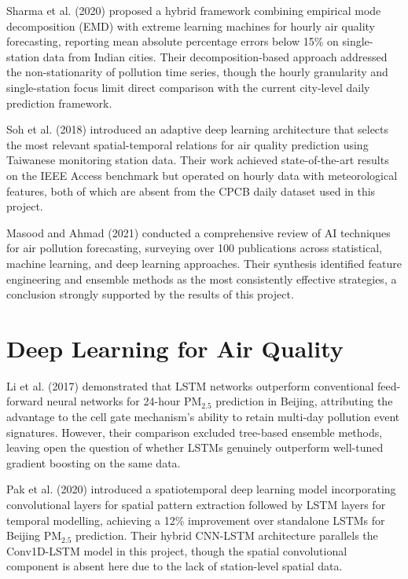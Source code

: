 \documentclass[12pt,a4paper]{report}
\begin{document}
Sharma et al. (2020) proposed a hybrid framework combining empirical mode decomposition (EMD) with extreme learning machines for hourly air quality forecasting, reporting mean absolute percentage errors below 15\% on single-station data from Indian cities. Their decomposition-based approach addressed the non-stationarity of pollution time series, though the hourly granularity and single-station focus limit direct comparison with the current city-level daily prediction framework.

Soh et al. (2018) introduced an adaptive deep learning architecture that selects the most relevant spatial-temporal relations for air quality prediction using Taiwanese monitoring station data. Their work achieved state-of-the-art results on the IEEE Access benchmark but operated on hourly data with meteorological features, both of which are absent from the CPCB daily dataset used in this project.

Masood and Ahmad (2021) conducted a comprehensive review of AI techniques for air pollution forecasting, surveying over 100 publications across statistical, machine learning, and deep learning approaches. Their synthesis identified feature engineering and ensemble methods as the most consistently effective strategies, a conclusion strongly supported by the results of this project.

\section{Deep Learning for Air Quality}

Li et al. (2017) demonstrated that LSTM networks outperform conventional feed-forward neural networks for 24-hour PM$_{2.5}$ prediction in Beijing, attributing the advantage to the cell gate mechanism's ability to retain multi-day pollution event signatures. However, their comparison excluded tree-based ensemble methods, leaving open the question of whether LSTMs genuinely outperform well-tuned gradient boosting on the same data.

Pak et al. (2020) introduced a spatiotemporal deep learning model incorporating convolutional layers for spatial pattern extraction followed by LSTM layers for temporal modelling, achieving a 12\% improvement over standalone LSTMs for Beijing PM$_{2.5}$ prediction. Their hybrid CNN-LSTM architecture parallels the Conv1D-LSTM model in this project, though the spatial convolutional component is absent here due to the lack of station-level spatial data.
\end{document}
